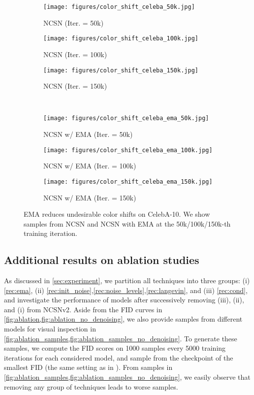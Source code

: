 \documentclass{article}
\begin{document}
\begin{figure}[H]
    \centering
    \begin{subfigure}{0.32\textwidth}
        \texttt{[image: figures/color\_shift\_celeba\_50k.jpg]}
        \caption{NCSN (Iter. = 50k)}
    \end{subfigure}
    \begin{subfigure}{0.32\textwidth}
        \texttt{[image: figures/color\_shift\_celeba\_100k.jpg]}
        \caption{NCSN (Iter. = 100k)}
    \end{subfigure}
    \begin{subfigure}{0.32\textwidth}
        \texttt{[image: figures/color\_shift\_celeba\_150k.jpg]}
        \caption{NCSN (Iter. = 150k)}
    \end{subfigure}\\
    \begin{subfigure}{0.32\textwidth}
        \texttt{[image: figures/color\_shift\_celeba\_ema\_50k.jpg]}
        \caption{NCSN w/ EMA (Iter. = 50k)}
    \end{subfigure}
    \begin{subfigure}{0.32\textwidth}
        \texttt{[image: figures/color\_shift\_celeba\_ema\_100k.jpg]}
        \caption{NCSN w/ EMA (Iter. = 100k)}
    \end{subfigure}
    \begin{subfigure}{0.32\textwidth}
        \texttt{[image: figures/color\_shift\_celeba\_ema\_150k.jpg]}
        \caption{NCSN w/ EMA (Iter. = 150k)}
    \end{subfigure}
    \caption{EMA reduces undesirable color shifts on CelebA-10. We show samples from NCSN and NCSN with EMA at the 50k/100k/150k-th training iteration.}
    \label{fig:color_shift_celeba}
\end{figure}
\vspace{1cm}
\subsection{Additional results on ablation studies}\label{app:ablation}
As discussed in \cref{sec:experiment}, we partition all techniques into three groups: (i) \cref{rec:ema}, (ii) \cref{rec:init_noise},\ref{rec:noise_levels},\ref{rec:langevin}, and (iii) \cref{rec:cond}, and investigate the performance of models after successively removing (iii), (ii), and (i) from NCSNv2. Aside from the FID curves in \cref{fig:ablation,fig:ablation_no_denoising}, we also provide samples from different models for visual inspection in \cref{fig:ablation_samples,fig:ablation_samples_no_denoising}. To generate these samples, we compute the FID scores on 1000 samples every 5000 training iterations for each considered model, and sample from the checkpoint of the smallest FID (the same setting as in \cite{song2019generative}). From samples in \cref{fig:ablation_samples,fig:ablation_samples_no_denoising}, we easily observe that removing any group of techniques leads to worse samples.
\end{document}
